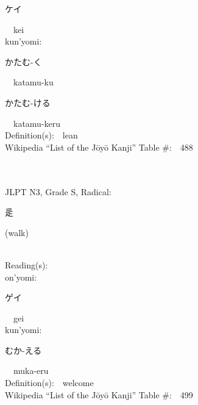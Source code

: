 \begin{multicols}{2}
{\hspace*{2em}}{\begin{CJK}{UTF8}{min} ケイ \end{CJK}}\ \ kei\ \ \\
{\hspace*{1em}}kun'yomi:\ \ \\
{\hspace*{2em}}{\begin{CJK}{UTF8}{min} かたむ-く \end{CJK}}\ \ katamu-ku\ \ \\
{\hspace*{2em}}{\begin{CJK}{UTF8}{min} かたむ-ける \end{CJK}}\ \ katamu-keru\ \ \\
Definition(s):\ \ lean \\
Wikipedia ``List of the J\=oy\=o Kanji'' Table \#:\ \ 488 \\
\ \ \\
{\fontsize{34pt}{40pt}  }\ \ \\  %
{JLPT N3, Grade S, Radical:\ \ {\begin{CJK}{UTF8}{min} 辵 \end{CJK}} (walk) } \\
Reading(s):\ \ \\
{\hspace*{1em}}on'yomi:\ \ \\
{\hspace*{2em}}{\begin{CJK}{UTF8}{min} ゲイ \end{CJK}}\ \ gei\ \ \\
{\hspace*{1em}}kun'yomi:\ \ \\
{\hspace*{2em}}{\begin{CJK}{UTF8}{min} むか-える \end{CJK}}\ \ muka-eru\ \ \\
Definition(s):\ \ welcome \\
Wikipedia ``List of the J\=oy\=o Kanji'' Table \#:\ \ 499 \\
\ \ \\
{\fontsize{34pt}{40pt}  }\ \ \\  %

\end{multicols}
